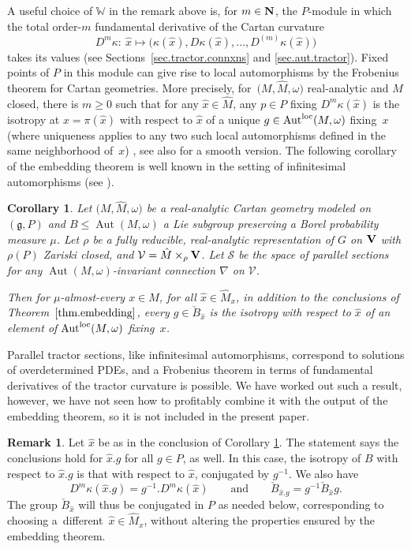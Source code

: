 \documentclass[10pt,a4paper]{amsart}
\numberwithin{equation}{section}
\newtheorem{cor}[thm]{Corollary}
\theoremstyle{definition}
\newtheorem{rem}[thm]{Remark}
\def\V{{\bf V}}
\newcommand{\lieg}{\mathfrak{g}}
\newcommand{\Aut}{\operatorname{Aut}}
\begin{document}
A useful choice of $\mathbb{W}$ in the remark above is, for $m \in {\bf N}$, the $P$-module in which the total
order-$m$ fundamental derivative of the Cartan curvature
\[D^m \kappa\colon \ \hat{x} \mapsto \bigl( \kappa(\hat{x}), D \kappa(\hat{x}), \dots, D^{(m)} \kappa(\hat{x}) \bigr)\]
takes its
values (see Sections~\ref{sec.tractor.connxns} and \ref{sec.aut.tractor}). Fixed points of $P$ in this module can give rise to local automorphisms
by the Frobenius theorem for Cartan geometries. More precisely, for~$\bigl(M,\hat{M}, \omega\bigr)$ real-analytic and $M$ closed, there is $m \geq 0$ such that for any $\hat{x} \in \hat{M}$, any $p \in P$ fixing $D^m \kappa(\hat{x})$ is the isotropy at $x = \pi(\hat{x})$ with respect to $\hat{x}$ of a unique $g \in \Aut^{\rm loc}(M,\omega)$ fixing~$x$ (where uniqueness applies to any two such local automorphisms defined in the same neighborhood of~$x$) \cite{me.frobenius}, see also \cite{pecastaing.frobenius} for a smooth version. The following corollary of the embedding theorem is well known in the setting of infinitesimal automorphisms (see \cite[Theorem~5.3]{me.frobenius}).

\begin{cor}
\label{cor.emb.frob}
Let
$\bigl(M, \hat{M},\omega\bigr)$ be a real-analytic Cartan geometry modeled on $(\lieg,P)$ and $B \leq \Aut(M,\omega)$ a Lie subgroup preserving a Borel probability measure $\mu$.
Let $\rho$ be a fully reducible, real-analytic representation of $G$ on $\V$ with $\rho(P)$ Zariski closed, and $\mathcal{V} = \hat{M}
 \times_\rho \V$. Let $\mathcal{S}$ be the space of parallel sections for any $\Aut(M,\omega)$-invariant connection $\nabla$ on $\mathcal{V}$.

 Then for $\mu$-almost-every $x \in M$, for all $\hat{x} \in \hat{M}_x$, in addition to the conclusions of Theorem~$\ref{thm.embedding}$, every $g \in \check{B}_{\hat{x}}$ is the isotropy with respect to $\hat{x}$ of an element of $\Aut^{{\rm loc}}(M,\omega)$ fixing~$x$.
\end{cor}

Parallel tractor sections, like infinitesimal automorphisms, correspond to solutions of overdetermined PDEs, and a Frobenius theorem in terms of fundamental derivatives of the tractor curvature is possible. We have worked out such a result, however, we have not seen how to profitably combine it with the output of the embedding theorem, so it is not included in the present paper.

\begin{rem}
\label{rem.conjugate.embedding}
Let $\hat{x}$ be as in the conclusion of Corollary \ref{cor.emb.frob}. The statement says the conclusions hold for $\hat{x}.g$ for all $g \in P$, as well. In this case, the isotropy of $B$ with respect to $\hat{x}.g$ is that with respect to $\hat{x}$, conjugated by $g^{-1}$. We also have
\[D^m \kappa(\hat{x}.g) = g^{-1}. D^m \kappa(\hat{x}) \qquad \mbox{and} \qquad \check{B}_{\hat{x}.g} = g^{-1} \check{B}_{\hat{x}} g.\]
The group $\check{B}_{\hat{x}}$ will thus be conjugated in $P$ as needed below, corresponding to choosing a~different~${\hat{x} \in \hat{M}_x}$, without altering the properties ensured by the embedding theorem.
\end{rem}
\end{document}

